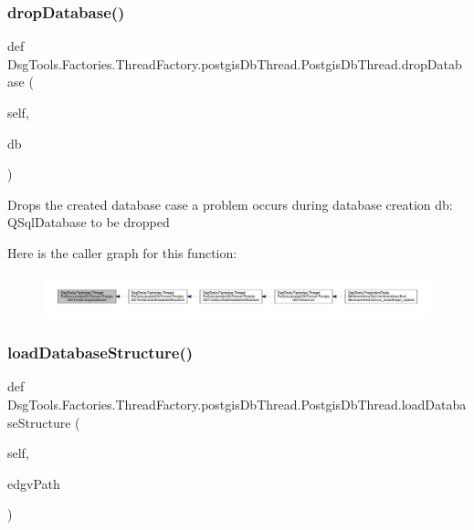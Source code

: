 \subsubsection{\texorpdfstring{drop\+Database()}{dropDatabase()}}
{\footnotesize\ttfamily def Dsg\+Tools.\+Factories.\+Thread\+Factory.\+postgis\+Db\+Thread.\+Postgis\+Db\+Thread.\+drop\+Database (\begin{DoxyParamCaption}\item[{}]{self,  }\item[{}]{db }\end{DoxyParamCaption})}

\begin{DoxyVerb}Drops the created database case a problem occurs during database creation
db: QSqlDatabase to be dropped
\end{DoxyVerb}
 Here is the caller graph for this function\+:
\nopagebreak
\begin{figure}[H]
\begin{center}
\leavevmode
\includegraphics[width=350pt]{class_dsg_tools_1_1_factories_1_1_thread_factory_1_1postgis_db_thread_1_1_postgis_db_thread_a94eafae562bc5ec0dfe616e42575a167_icgraph}
\end{center}
\end{figure}
\mbox{\label{class_dsg_tools_1_1_factories_1_1_thread_factory_1_1postgis_db_thread_1_1_postgis_db_thread_af5c5bd0603c93b226b72ba5a2c467c96}} 
\subsubsection{\texorpdfstring{load\+Database\+Structure()}{loadDatabaseStructure()}}
{\footnotesize\ttfamily def Dsg\+Tools.\+Factories.\+Thread\+Factory.\+postgis\+Db\+Thread.\+Postgis\+Db\+Thread.\+load\+Database\+Structure (\begin{DoxyParamCaption}\item[{}]{self,  }\item[{}]{edgv\+Path }\end{DoxyParamCaption})}


